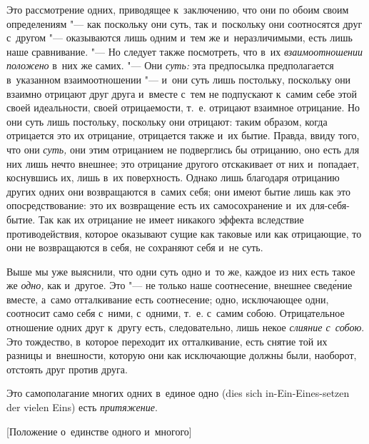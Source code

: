 Это рассмотрение одних, приводящее к~заключению, что они по обоим своим
определениям "--- как поскольку они суть, так и~поскольку они соотносятся друг
с~другом "--- оказываются лишь одним и~тем же и~неразличимыми, есть лишь наше
сравнивание. "--- Но следует также посмотреть, что в~их
{\em взаимоотношении положено} в~них же самих. "--- Они
{\em суть:} эта предпосылка предполагается в~указанном
взаимоотношении "--- и~они суть лишь постольку, поскольку они взаимно отрицают
друг друга и~вместе с~тем не подпускают к~самим себе этой своей
идеальности, своей отрицаемости, т.~е. отрицают взаимное отрицание. Но они
суть лишь постольку, поскольку они отрицают: таким образом, когда
отрицается это их отрицание, отрицается также и~их бытие. Правда, ввиду
того, что они {\em суть,} они этим отрицанием не
подверглись бы отрицанию, оно есть для них лишь нечто внешнее; это
отрицание другого отскакивает от них и~попадает, коснувшись их, лишь в~их
поверхность. Однако лишь благодаря отрицанию других одних они возвращаются
в~самих себя; они имеют бытие лишь как это опосредствование: это их
возвращение есть их самосохранение и~их для-себя-бытие. Так как их
отрицание не имеет никакого эффекта вследствие противодействия, которое
оказывают сущие как таковые или как отрицающие, то они не возвращаются в
себя, не сохраняют себя и~не суть.

Выше мы уже выяснили, что одни суть одно и~то же, каждое из них есть такое
же {\em одно,} как и~другое. Это "--- не только наше
соотнесение, внешнее свед\'{е}ние вместе, а~само отталкивание есть соотнесение;
одно, исключающее одни, соотносит само себя с~ними, с~одними, т.~е. с~самим
собою. Отрицательное отношение одних друг к~другу есть, следовательно, лишь
некое {\em слияние с~собою}. Это тождество, в~которое
переходит их отталкивание, есть снятие той их разницы и~внешности, которую
они как исключающие должны были, наоборот, отстоять друг против друга.

Это самополагание многих одних в~единое одно (dies sich
in-Ein-Eines-setzen der vielen Eins) есть {\em притяжение}.

%
{[Положение о~единстве одного и~многого]}

